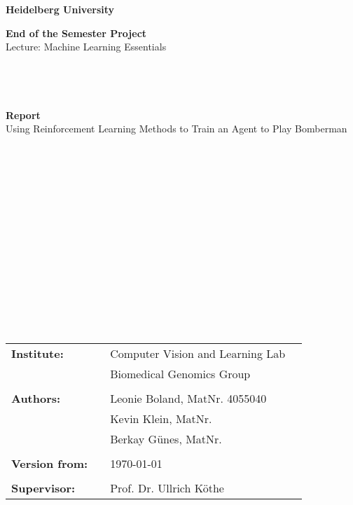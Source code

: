 \thispagestyle{empty}

\begin{verbatim}
	
	
	
\end{verbatim}

\begin{center}
	\Large{\textbf{Heidelberg University}}
\end{center}


\begin{center}
	\Large{\textbf{End of the Semester Project}}\\
	\Large{Lecture: Machine Learning Essentials}
\end{center}

\begin{verbatim}
	
	
	
\end{verbatim}

\begin{center}
	\large{\textbf{Report}}\\
	\huge{Using Reinforcement Learning Methods to Train an Agent to Play Bomberman}	
\end{center}

\begin{verbatim}
	
	
	
	
	
	
	
	
	
	
	
	
	
	
	
	
\end{verbatim}

\begin{flushleft}
	\begin{tabular}{llll}
		\textbf{Institute:} && Computer Vision and Learning Lab & \\
		&& Biomedical Genomics Group& \\
		&& \\
		\textbf{Authors:} & & Leonie Boland, MatNr. 4055040& \\
		& & Kevin Klein, MatNr. & \\
		& & Berkay Günes, MatNr. & \\
		& &\\
		\textbf{Version from:} & & \today &\\
		& & \\
		\textbf{Supervisor:} & & Prof. Dr. Ullrich Köthe &\\
	\end{tabular}
\end{flushleft}